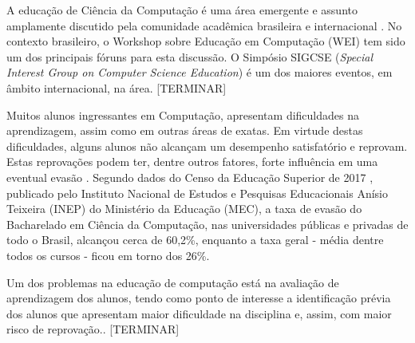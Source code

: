 \documentclass[
	12pt,				%
	openright,			%
	oneside,
	a4paper,			%
	english,			%
	french,				%
	spanish,			%
	brazil,				%
	]{abntex2}
\begin{document}




A educação de Ciência da Computação é uma área emergente e assunto amplamente discutido pela comunidade acadêmica brasileira e internacional \cite{fincher2005mapping}. No contexto brasileiro, o Workshop sobre Educação em Computação (WEI) tem sido um dos principais fóruns para esta discussão. O Simpósio SIGCSE (\textit{Special Interest Group on Computer Science Education}) é um dos maiores eventos, em âmbito internacional, na área. {\color{red}[TERMINAR]}

Muitos alunos ingressantes em Computação, apresentam dificuldades na aprendizagem, assim como em outras áreas de exatas. Em virtude destas dificuldades, alguns alunos não alcançam um desempenho satisfatório e reprovam. Estas reprovações podem ter, dentre outros fatores, forte influência em uma eventual evasão \cite{evasaoMatheus2014}. Segundo dados do Censo da Educação Superior de 2017 \cite{Inep2017}, publicado pelo Instituto Nacional de Estudos e Pesquisas Educacionais Anísio Teixeira (INEP) do Ministério da Educação (MEC), a taxa de evasão do Bacharelado em Ciência da Computação, nas universidades públicas e privadas de todo o Brasil, alcançou cerca de 60,2\%, enquanto a taxa geral - média dentre todos os cursos - ficou em torno dos 26\%.

Um dos problemas na educação de computação está na avaliação de aprendizagem dos alunos, tendo como ponto de interesse
a identificação prévia dos alunos que apresentam maior dificuldade na disciplina e, assim, com maior risco de reprovação.\cite{martins2012assistente}. {\color{red}[TERMINAR]}
\end{document}
